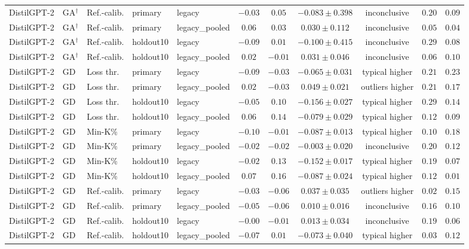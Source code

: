 {\begin{longtable}{@{\extracolsep{\fill}}lllllcccccc@{}}
DistilGPT-2 & GA$^{\dagger}$ & Ref.-calib. & primary & legacy & $-0.03$ & $0.05$ & $-0.083 \pm 0.398$ & inconclusive & $0.20$ & $0.09$ \\
DistilGPT-2 & GA$^{\dagger}$ & Ref.-calib. & primary & legacy\_pooled & $0.06$ & $0.03$ & $0.030 \pm 0.112$ & inconclusive & $0.05$ & $0.04$ \\
DistilGPT-2 & GA$^{\dagger}$ & Ref.-calib. & holdout10 & legacy & $-0.09$ & $0.01$ & $-0.100 \pm 0.415$ & inconclusive & $0.29$ & $0.08$ \\
DistilGPT-2 & GA$^{\dagger}$ & Ref.-calib. & holdout10 & legacy\_pooled & $0.02$ & $-0.01$ & $0.031 \pm 0.046$ & inconclusive & $0.06$ & $0.10$ \\
DistilGPT-2 & GD & Loss thr. & primary & legacy & $-0.09$ & $-0.03$ & $-0.065 \pm 0.031$ & typical higher & $0.21$ & $0.23$ \\
DistilGPT-2 & GD & Loss thr. & primary & legacy\_pooled & $0.02$ & $-0.03$ & $0.049 \pm 0.021$ & outliers higher & $0.21$ & $0.17$ \\
DistilGPT-2 & GD & Loss thr. & holdout10 & legacy & $-0.05$ & $0.10$ & $-0.156 \pm 0.027$ & typical higher & $0.29$ & $0.14$ \\
DistilGPT-2 & GD & Loss thr. & holdout10 & legacy\_pooled & $0.06$ & $0.14$ & $-0.079 \pm 0.029$ & typical higher & $0.12$ & $0.09$ \\
DistilGPT-2 & GD & Min-K\% & primary & legacy & $-0.10$ & $-0.01$ & $-0.087 \pm 0.013$ & typical higher & $0.10$ & $0.18$ \\
DistilGPT-2 & GD & Min-K\% & primary & legacy\_pooled & $-0.02$ & $-0.02$ & $-0.003 \pm 0.020$ & inconclusive & $0.20$ & $0.12$ \\
DistilGPT-2 & GD & Min-K\% & holdout10 & legacy & $-0.02$ & $0.13$ & $-0.152 \pm 0.017$ & typical higher & $0.19$ & $0.07$ \\
DistilGPT-2 & GD & Min-K\% & holdout10 & legacy\_pooled & $0.07$ & $0.16$ & $-0.087 \pm 0.024$ & typical higher & $0.12$ & $0.01$ \\
DistilGPT-2 & GD & Ref.-calib. & primary & legacy & $-0.03$ & $-0.06$ & $0.037 \pm 0.035$ & outliers higher & $0.02$ & $0.15$ \\
DistilGPT-2 & GD & Ref.-calib. & primary & legacy\_pooled & $-0.05$ & $-0.06$ & $0.010 \pm 0.016$ & inconclusive & $0.16$ & $0.10$ \\
DistilGPT-2 & GD & Ref.-calib. & holdout10 & legacy & $-0.00$ & $-0.01$ & $0.013 \pm 0.034$ & inconclusive & $0.19$ & $0.06$ \\
DistilGPT-2 & GD & Ref.-calib. & holdout10 & legacy\_pooled & $-0.07$ & $0.01$ & $-0.073 \pm 0.040$ & typical higher & $0.03$ & $0.12$ \\

\end{longtable}}
